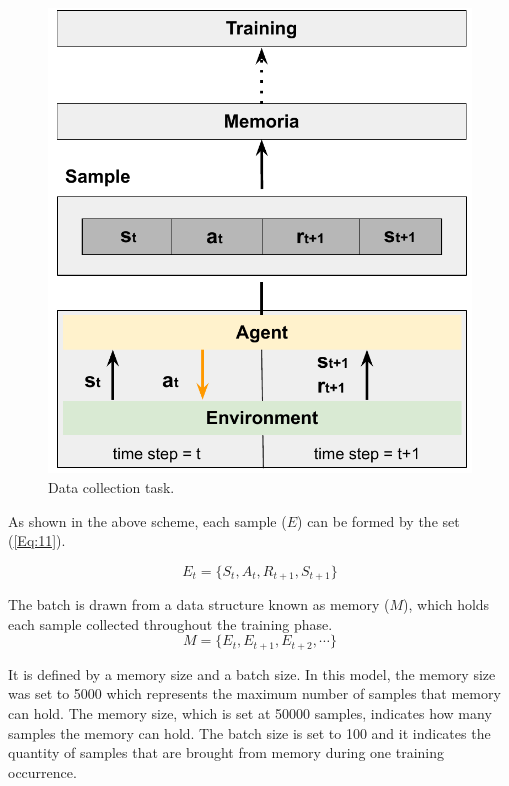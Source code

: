 \documentclass[conference]{IEEEtran}
\begin{document}
\begin{figure}[!ht]
    \centering
    \begin{center}
    \includegraphics[scale=0.4]{images/Data_collection.pdf}
    \end{center}
    \caption{Data collection task.}
    \label{fig:7}
\end{figure}

As shown in the above scheme, each sample ($E$) can be formed by the set (\ref{Eq:11}).

\begin{equation}\label{Eq:11}
    E_t = \{S_{t}, A_{t}, R_{t+1}, S_{t+1}\}
\end{equation}

The batch is drawn from a data structure known as memory ($M$), which holds each sample collected throughout the training phase. 
\begin{equation}\label{Eq:12}
    M = \{E_{t}, E_{t+1}, E_{t+2}, \cdots\}
\end{equation}

It is defined by a memory size and a batch size. In this model, the memory size was set to 5000 which represents the maximum number of samples that memory can hold. The memory size, which is set at 50000 samples, indicates how many samples the memory can hold. The batch size is set to 100 and it indicates the quantity of samples that are brought from memory during one training occurrence. 
\end{document}
